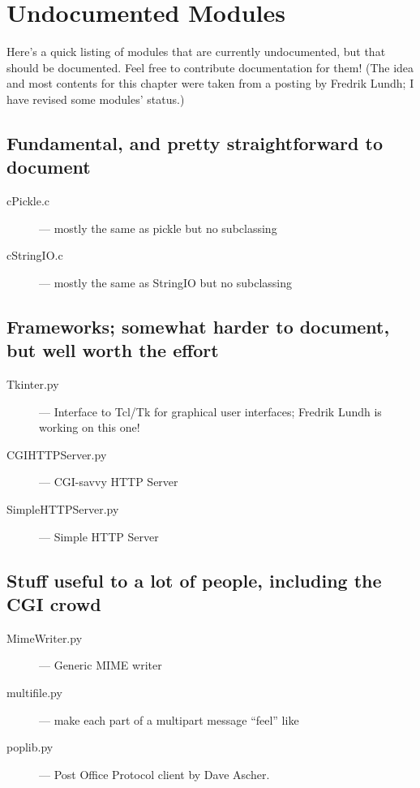 \chapter{Undocumented Modules}
\label{undoc}

Here's a quick listing of modules that are currently undocumented, but
that should be documented.  Feel free to contribute documentation for
them!  (The idea and most contents for this chapter were taken from a
posting by Fredrik Lundh; I have revised some modules' status.)


\section{Fundamental, and pretty straightforward to document}

\begin{description}
\item[cPickle.c]
--- mostly the same as pickle but no subclassing

\item[cStringIO.c]
--- mostly the same as StringIO but no subclassing
\end{description}


\section{Frameworks; somewhat harder to document, but well worth the effort}

\begin{description}
\item[Tkinter.py]
--- Interface to Tcl/Tk for graphical user interfaces;
Fredrik Lundh is working on this one!

\item[CGIHTTPServer.py]
--- CGI-savvy HTTP Server

\item[SimpleHTTPServer.py]
--- Simple HTTP Server
\end{description}


\section{Stuff useful to a lot of people, including the CGI crowd}

\begin{description}
\item[MimeWriter.py]
--- Generic MIME writer

\item[multifile.py]
--- make each part of a multipart message ``feel'' like

\item[poplib.py]
--- Post Office Protocol client by Dave Ascher.
\end{description}


